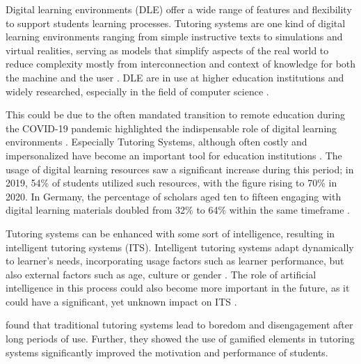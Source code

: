 Digital learning environments (DLE) offer a wide range of features and flexibility to support students learning processes. Tutoring systems are one kind of digital learning environments ranging from simple instructive texts to simulations and virtual realities, serving as models that simplify aspects of the real world to reduce complexity mostly from interconnection and context of knowledge for both the machine and the user \parencite{psotkaIntelligentTutoringSystems1988}.
DLE are in use at higher education institutions and widely researched, especially in the field of computer science \parencite{zawacki-richterSystematicReviewResearch2019}.


This could be due to the often mandated transition to remote education during the COVID-19 pandemic highlighted the indispensable role of digital learning environments \parencite{garcia-moralesTransformationHigherEducation2021}.
Especially Tutoring Systems, although often costly and impersonalized have become an important tool for education institutions \parencite{elhadbiReviewStudyAdaptive2024}.
The usage of digital learning resources saw a significant increase during this period; in 2019, 54\% of students utilized such resources, with the figure rising to 70\% in 2020.
In Germany, the percentage of scholars aged ten to fifteen engaging with digital learning materials doubled from 32\% to 64\% within the same timeframe \parencite{statistischesbundesamtsDigitalesLernenNimmt2020}.


Tutoring systems can be enhanced with some sort of intelligence, resulting in intelligent tutoring systems (ITS). Intelligent tutoring systems adapt dynamically to learner's needs, incorporating usage factors such as learner performance, but also external factors such as age, culture or gender \parencite{nkambouAdvancesIntelligentTutoring2010, gonzalezGamificationIntelligentTutoring2014}.
The role of artificial intelligence in this process could also become more important in the future, as it could have a significant, yet unknown impact on ITS \parencite{zawacki-richterSystematicReviewResearch2019}.

\textcite{jacksonMotivationPerformanceGamebased2013} found that traditional tutoring systems lead to boredom and disengagement after long periods of use. Further, they showed the use of gamified elements in tutoring systems significantly improved the motivation and performance of students.

